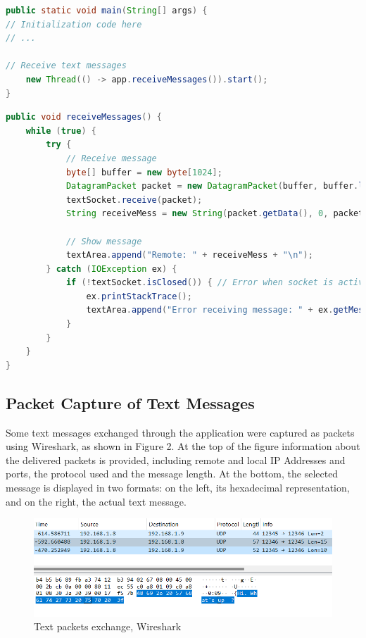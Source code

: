 \documentclass{article}
\begin{document}
\newpage
\begin{lstlisting}[language=Java, caption={Thread initiallization}]
public static void main(String[] args) {
// Initialization code here
// ...

// Receive text messages
	new Thread(() -> app.receiveMessages()).start();
}
\end{lstlisting}

\begin{lstlisting}[language=Java, caption={Function for receiving messages}]
public void receiveMessages() {
	while (true) {
		try {
			// Receive message
			byte[] buffer = new byte[1024];
			DatagramPacket packet = new DatagramPacket(buffer, buffer.length);
			textSocket.receive(packet);
			String receiveMess = new String(packet.getData(), 0, packet.getLength());

			// Show message
			textArea.append("Remote: " + receiveMess + "\n");
		} catch (IOException ex) {
			if (!textSocket.isClosed()) { // Error when socket is active
				ex.printStackTrace();
				textArea.append("Error receiving message: " + ex.getMessage() + "\n");
			}
		}
	}
}
\end{lstlisting}


\subsection{Packet Capture of Text Messages}
Some text messages exchanged through the application were captured as packets using Wireshark, as shown in Figure 2. At the top of the figure information about the delivered packets is provided, including remote and local IP Addresses and ports, the protocol used and the message length. At the bottom, the selected message is displayed in two formats: on the left, its hexadecimal representation, and on the right, the actual text message.

\begin{figure}
    \centering
    \includegraphics[width=1\linewidth]{image2.png}
    \caption{Text packets exchange, Wireshark}
    \label{fig:enter-label}
\end{figure}
\end{document}
